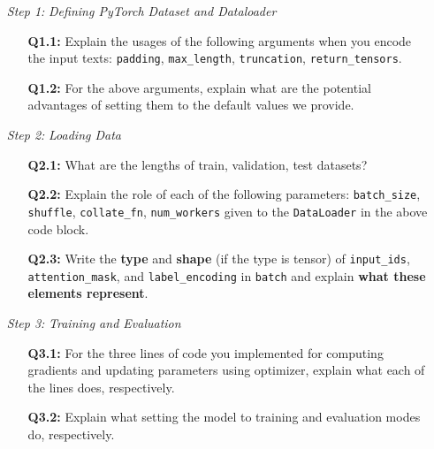 \documentclass{article}
\begin{document}
\begin{itemize}
    \item[\textit{Step 1:}] \textit{Defining PyTorch Dataset and Dataloader}
    
    \begin{itemize}
        \item[\textbf{Q1.1:}] Explain the usages of the following arguments when
        you encode the input texts: \texttt{padding}, \texttt{max\_length},
        \texttt{truncation}, \texttt{return\_tensors}.
        \item[\textbf{Q1.2:}] For the above arguments, explain what are the
        potential advantages of setting them to the default values we provide.
    \end{itemize}
    
    \item[\textit{Step 2:}] \textit{Loading Data}
    
    \begin{itemize}
        \item[\textbf{Q2.1:}] What are the lengths of train, validation, test
        datasets?
        
        \item[\textbf{Q2.2:}] Explain the role of each of the following
        parameters: \texttt{batch\_size}, \texttt{shuffle},
        \texttt{collate\_fn}, \texttt{num\_workers} given to the
        \texttt{DataLoader} in the above code block.
        
        \item[\textbf{Q2.3:}] Write the \textbf{type} and \textbf{shape} (if the
        type is tensor) of \texttt{input\_ids}, \texttt{attention\_mask}, and
        \texttt{label\_encoding} in \texttt{batch} and explain \textbf{what
        these elements represent}.
    \end{itemize}
    
    \item[\textit{Step 3:}] \textit{Training and Evaluation}

    \begin{itemize}
        \item[\textbf{Q3.1:}] For the three lines of code you implemented for
        computing gradients and updating parameters using optimizer, explain
        what each of the lines does, respectively.
        
        \item[\textbf{Q3.2:}] Explain what setting the model to training and
        evaluation modes do, respectively.
        

\end{itemize}
\end{itemize}
\end{document}
